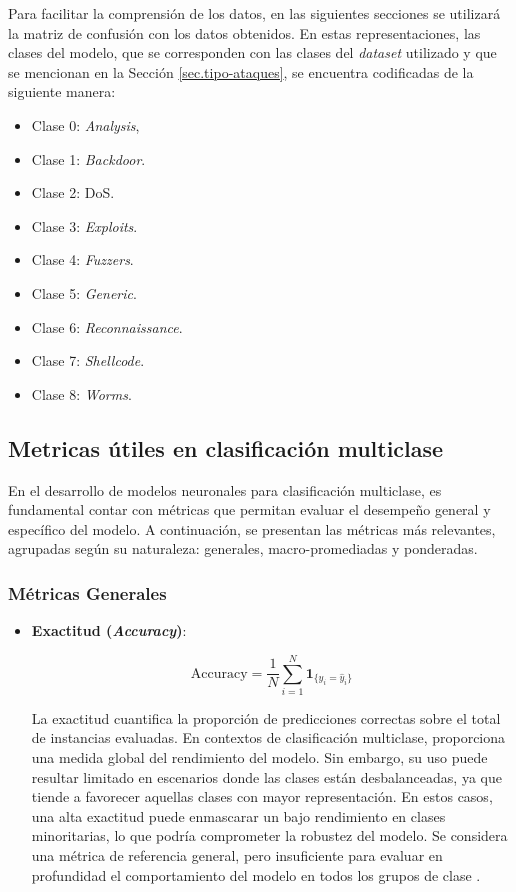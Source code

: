 Para facilitar la comprensión de los datos, en las siguientes secciones se utilizará la matriz de confusión con los datos obtenidos. En estas representaciones, las clases del modelo, que se corresponden con las clases del \textit{dataset} utilizado y que se mencionan en la Sección \ref{sec.tipo-ataques}, se encuentra codificadas de la siguiente manera:

\begin{itemize}
	\item Clase 0: \textit{Analysis},
	\item Clase 1: \textit{Backdoor}.
	\item Clase 2: DoS.
	\item Clase 3: \textit{Exploits}. 
	\item Clase 4: \textit{Fuzzers}.
	\item Clase 5: \textit{Generic}.
	\item Clase 6: \textit{Reconnaissance}.
	\item Clase 7: \textit{Shellcode}.
	\item Clase 8: \textit{Worms}.
\end{itemize}


\subsection{Metricas útiles en clasificación multiclase} \label{sec:metricas-mul}

En el desarrollo de modelos neuronales para clasificación multiclase, es fundamental contar con métricas que permitan evaluar el desempeño general y específico del modelo. A continuación, se presentan las métricas más relevantes, agrupadas según su naturaleza: generales, macro-promediadas y ponderadas.
\subsubsection*{Métricas Generales}

\begin{itemize}

\item \textbf{Exactitud (\textit{Accuracy})}:

\begin{equation}
\text{Accuracy} = \frac{1}{N} \sum_{i=1}^{N} \mathbf{1}_{\{y_i = \hat{y}_i\}}
\end{equation}

La exactitud cuantifica la proporción de predicciones correctas sobre el total de instancias evaluadas. En contextos de clasificación multiclase, proporciona una medida global del rendimiento del modelo. Sin embargo, su uso puede resultar limitado en escenarios donde las clases están desbalanceadas, ya que tiende a favorecer aquellas clases con mayor representación. En estos casos, una alta exactitud puede enmascarar un bajo rendimiento en clases minoritarias, lo que podría comprometer la robustez del modelo. Se considera una métrica de referencia general, pero insuficiente para evaluar en profundidad el comportamiento del modelo en todos los grupos de clase \cite{Sokolova2006}.

\end{itemize}

